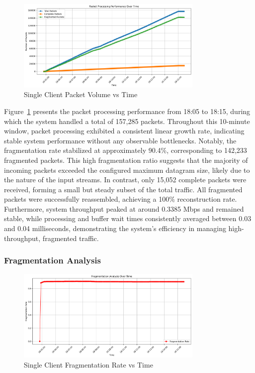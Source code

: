 \begin{figure}[h!]
\centering
\includegraphics[width=0.8\textwidth]{Evaluation/single_packet_processing_performance.png}
\caption{Single Client Packet Volume vs Time}
\label{fig:single-packet-performance}
\end{figure}

Figure~\ref{fig:single-packet-performance} presents the packet processing performance from 18:05 to 18:15, during which the system handled a total of 157,285 packets. Throughout this 10-minute window, packet processing exhibited a consistent linear growth rate, indicating stable system performance without any observable bottlenecks. Notably, the fragmentation rate stabilized at approximately 90.4\%, corresponding to 142,233 fragmented packets. This high fragmentation ratio suggests that the majority of incoming packets exceeded the configured maximum datagram size, likely due to the nature of the input streams. In contrast, only 15,052 complete packets were received, forming a small but steady subset of the total traffic. All fragmented packets were successfully reassembled, achieving a 100\% reconstruction rate. Furthermore, system throughput peaked at around 0.3385 Mbps and remained stable, while processing and buffer wait times consistently averaged between 0.03 and 0.04 milliseconds, demonstrating the system's efficiency in managing high-throughput, fragmented traffic.


\subsubsection{Fragmentation Analysis}

\begin{figure}[h!]
\centering
\includegraphics[width=0.8\textwidth]{Evaluation/single_fragmentation_analysis.png}
\caption{Single Client Fragmentation Rate vs Time}
\label{fig:fragmentation-analysis}
\end{figure}

